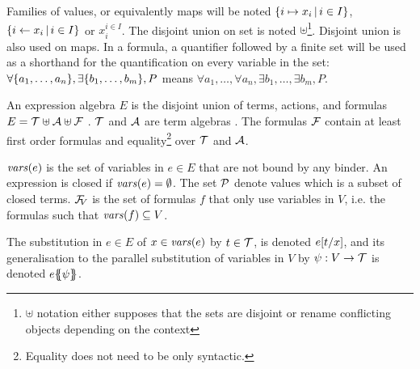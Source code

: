 \documentclass[runningheads]{llncs}
\begin{document}
Families of values, or equivalently maps will be noted \(\mset{i \mapsto x_i}{i \in I}\), \(\mset{i \gets x_i}{i \in I}\) or \(x_i^{i \in I}\). %
The disjoint union on set is noted \(\uplus\)\footnote{\(\uplus\) notation either supposes that the sets are disjoint or rename conflicting objects depending on the context}. Disjoint union is also used on maps.
In a formula, a quantifier followed by a finite set will be used as a shorthand for the quantification on every variable in the set:
\(\forall \mbrc{a_1, \dots, a_n}, \exists \mbrc{b_1, \dots, b_m}, P\) means \(\forall a_1, \dots, \forall a_n, \exists b_1, \dots, \exists b_m, P\).

An expression algebra \(E\) is the disjoint union  of  terms,  actions, and  formulas
\( E=\terms \uplus \actions \uplus \formulas\) .
\(\terms\) and \(\actions\) are term algebras .
The formulas \(\formulas\) contain at least first order formulas and equality\footnote{Equality does not need to be only syntactic.} over \(\terms\) and \(\actions\). 

 \(\fvars{e}\) is the set of variables in \(e \in E\) that are not bound by any binder. An expression is closed if \(\fvars{e}=\emptyset\).
The set \(\values\) denote values which is a subset of closed terms. \(\rformulas[V]\) is the set of formulas $f$ that only use variables in $V$, i.e. the formulas such that  \(\fvars{f}\subseteq V\).

The substitution in \(e \in E\) of \(x \in \fvars{e}\) by \(t \in \terms\), is denoted \(e\subst{t}{x}\), and its generalisation to the parallel substitution of variables in \(V\) by \(\psi: V \to \terms\) is denoted \(e\psubst{\psi}\).
\end{document}
